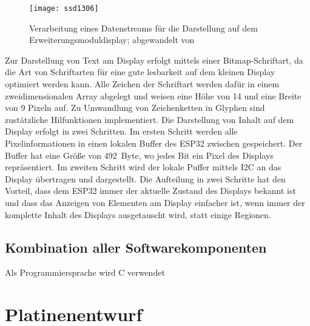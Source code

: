 \begin{figure}[h]
    \centering
    \texttt{[image: ssd1306]}
    \caption{Verarbeitung eines Datenstreams für die Darstellung auf dem Erweiterungsmoduldisplay; abgewandelt von \cite[S.~37]{ssd1306}}
    \label{fig:ssd1306PixelControl}
\end{figure}

Zur Darstellung von Text am Display erfolgt mittels einer Bitmap-Schriftart, da die Art von Schriftarten für eine gute lesbarkeit auf dem kleinen Display optimiert werden kann. Alle Zeichen der Schriftart werden dafür in einem zweidimensionalen Array abgelegt und weisen eine Höhe von 14 und eine Breite von 9 Pixeln auf. Zu Umwandlung von Zeichenketten in Glyphen sind zustätzliche Hilfunktionen implementiert. Die Darstellung von Inhalt auf dem Display erfolgt in zwei Schritten. Im ersten Schritt werden alle Pixelinformationen in einen lokalen Buffer des ESP32 zwischen gespeichert. Der Buffer hat eine Größe von 492~Byte, wo jedes Bit ein Pixel des Displays repräsentiert. Im zweiten Schritt wird der lokale Puffer mittels \ac{I2C} an das Display übertragen und dargestellt. Die Aufteilung in zwei Schritte hat den Vorteil, dass dem ESP32 immer der aktuelle Zustand des Displays bekannt ist und dass das Anzeigen von Elementen am Display einfacher ist, wenn immer der komplette Inhalt des Displays ausgetauscht wird, statt einige Regionen.

\subsection{Kombination aller Softwarekomponenten}
Als Programmiersprache wird C verwendet




\section{Platinenentwurf}

